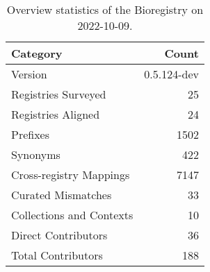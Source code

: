 \begin{table}
\centering
\caption{Overview statistics of the Bioregistry on 2022-10-09.}
\label{tab:bioregistry-summary}
\begin{tabular}{lr}
\toprule
                Category &       Count \\
\midrule
                 Version & 0.5.124-dev \\
     Registries Surveyed &          25 \\
      Registries Aligned &          24 \\
                Prefixes &        1502 \\
                Synonyms &         422 \\
 Cross-registry Mappings &        7147 \\
      Curated Mismatches &          33 \\
Collections and Contexts &          10 \\
     Direct Contributors &          36 \\
      Total Contributors &         188 \\
\bottomrule
\end{tabular}
\end{table}
